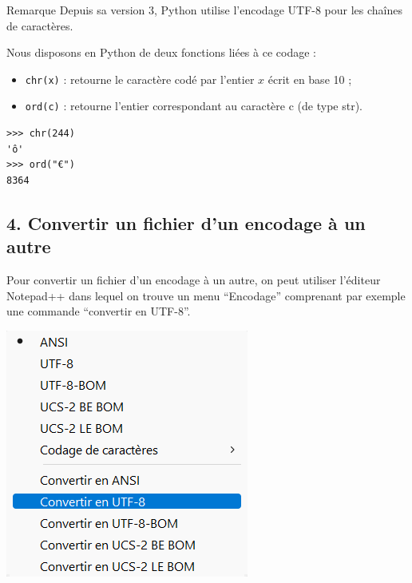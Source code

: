 \documentclass[11pt,a4paper]{article}
\providecommand{\tightlist}{\setlength{\itemsep}{0pt}\setlength{\parskip}{0pt}}
\newenvironment{remarque}[1]{\begin{tcolorbox}[title= {\color{SkyBlue} \faInfo}~~\textbf{Remarque #1}, colframe=SkyBlue, colback=white, colbacktitle=SkyBlue!20!white, coltitle=black, boxrule=0.1mm, titlerule=0mm]}{\end{tcolorbox}}
\begin{document}
\begin{remarque}{}
Remarque Depuis sa version 3, Python utilise l'encodage UTF-8 pour les
chaînes de caractères.

Nous disposons en Python de deux fonctions liées à ce codage :

\begin{itemize}
\tightlist
\item
  \texttt{chr(x)} : retourne le caractère codé par l'entier \(x\) écrit
  en base 10 ;
\item
  \texttt{ord(c)} : retourne l'entier correspondant au caractère c (de
  type str).
\end{itemize}

\begin{center}
\begin{minipage}{3cm}
\begin{verbatim}
>>> chr(244)
'ô'
>>> ord("€")
8364
\end{verbatim}
\end{minipage}
\end{center}

\end{remarque}

\hypertarget{convertir-un-fichier-dun-encodage-uxe0-un-autre}{%
\subsection*{4. Convertir un fichier d'un encodage à un
autre}\label{convertir-un-fichier-dun-encodage-uxe0-un-autre}}

Pour convertir un fichier d'un encodage à un autre, on peut utiliser
l'éditeur Notepad++ dans lequel on trouve un menu ``Encodage''
comprenant par exemple une commande ``convertir en UTF-8''.

\begin{center}
\includegraphics[scale=0.5]{../../../assets/images/notepad_encodage.png}
\end{center}
\end{document}
